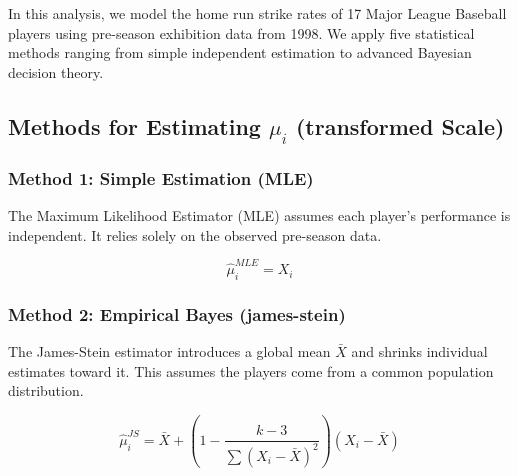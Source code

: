 \documentclass[
  letterpaper,
  DIV=11,
  numbers=noendperiod]{scrreprt}
\newenvironment{Shaded}{\begin{snugshade}}{\end{snugshade}}
\newcommand{\CommentTok}[1]{\textcolor[rgb]{0.37,0.37,0.37}{#1}}
\newcommand{\DecValTok}[1]{\textcolor[rgb]{0.68,0.00,0.00}{#1}}
\newcommand{\FunctionTok}[1]{\textcolor[rgb]{0.28,0.35,0.67}{#1}}
\newcommand{\NormalTok}[1]{\textcolor[rgb]{0.00,0.23,0.31}{#1}}
\newcommand{\OtherTok}[1]{\textcolor[rgb]{0.00,0.23,0.31}{#1}}
\newcommand{\SpecialCharTok}[1]{\textcolor[rgb]{0.37,0.37,0.37}{#1}}
\renewcommand{\[}{\begin{equation}}
\renewcommand{\]}{\end{equation}}
\theoremstyle{definition}
\theoremstyle{plain}
\theoremstyle{plain}
\theoremstyle{plain}
\theoremstyle{definition}
\theoremstyle{plain}
\theoremstyle{remark}
\begin{document}
In this analysis, we model the home run strike rates of 17 Major League
Baseball players using pre-season exhibition data from 1998. We apply
five statistical methods ranging from simple independent estimation to
advanced Bayesian decision theory.

\subsection{\texorpdfstring{Methods for Estimating \(\mu_i\)
(transformed
Scale)}{Methods for Estimating \textbackslash mu\_i (transformed Scale)}}\label{methods-for-estimating-mu_i-transformed-scale}

\subsubsection{Method 1: Simple Estimation
(MLE)}\label{method-1-simple-estimation-mle}

The Maximum Likelihood Estimator (MLE) assumes each player's performance
is independent. It relies solely on the observed pre-season data.

\[ \hat{\mu}_i^{MLE} = X_i \]

\begin{Shaded}
\end{Shaded}

\subsubsection{Method 2: Empirical Bayes
(james-stein)}\label{method-2-empirical-bayes-james-stein}

The James-Stein estimator introduces a global mean \(\bar{X}\) and
shrinks individual estimates toward it. This assumes the players come
from a common population distribution.

\[ \hat{\mu}_i^{JS} = \bar{X} + \left( 1 - \frac{k-3}{\sum (X_i - \bar{X})^2} \right) (X_i - \bar{X}) \]
\end{document}
